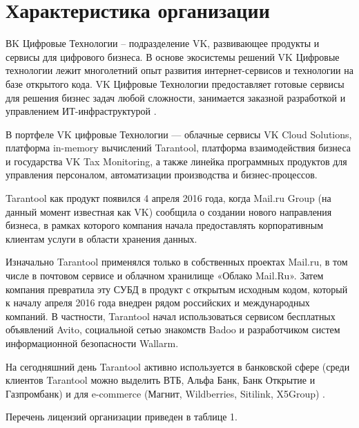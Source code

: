 
\section{Характеристика организации}

ВK Цифровые Технологии – подразделение VK, развивающее продукты и сервисы для
цифрового бизнеса. В основе экосистемы решений VK Цифровые технологии лежит
многолетний опыт развития интернет-сервисов и технологии на базе открытого
кода. VK Цифровые Технологии предоставляет готовые сервисы для решения бизнес
задач любой сложности, занимается заказной разработкой и управлением
ИТ-инфраструктурой \cite{VkTech}.

В портфеле VK цифровые Технологии — облачные сервисы VK Cloud Solutions,
платформа in-memory вычислений Tarantool, платформа взаимодействия бизнеса и
государства VK Tax Monitoring, а также линейка программных продуктов для
управления персоналом, автоматизации производства и бизнес-процессов.

Tarantool как продукт появился 4 апреля 2016 года, когда Mail.ru Group (на
данный момент известная как VK) сообщила о создании нового направления бизнеса,
в рамках которого компания начала предоставлять корпоративным клиентам услуги в
области хранения данных.

Изначально Tarantool применялся только в собственных проектах Mail.ru, в том
числе в почтовом сервисе и облачном хранилище «Облако Mail.Ru». Затем компания
превратила эту СУБД в продукт с открытым исходным кодом, который к началу
апреля 2016 года внедрен рядом российских и международных компаний. В
частности, Tarantool начал использоваться сервисом бесплатных объявлений Avito,
социальной сетью знакомств Badoo и разработчиком систем информационной
безопасности Wallarm.

На сегодняшний день Tarantool активно используется в банковской сфере (среди
клиентов Tarantool можно выделить ВТБ, Альфа Банк, Банк Открытие и Газпромбанк)
и для e-commerce (Магнит, Wildberries, Sitilink, X5Group)
\cite{Tarantool}.

Перечень лицензий организации приведен в таблице 1.

